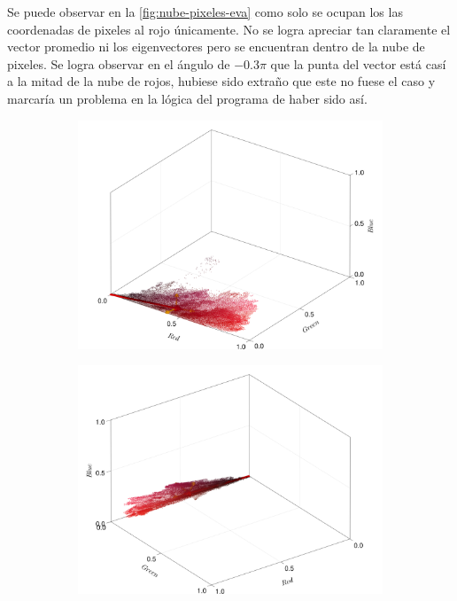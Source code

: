 Se puede observar en la \cref{fig:nube-pixeles-eva} como solo se ocupan los las coordenadas de pixeles al rojo únicamente. No se logra apreciar tan claramente el vector promedio ni los eigenvectores pero se encuentran dentro de la nube de pixeles. Se logra observar en el ángulo de $-0.3\pi$ que la punta del vector está casí a la mitad de la nube de rojos, hubiese sido extraño que este no fuese el caso y marcaría un problema en la lógica del programa de haber sido así.
\begin{figure}[ht!]
    \centering
    \begin{subfigure}[c]{0.3\textwidth}
        \centering
        \includegraphics[scale=0.09]{../pictures/pixel_cloud_eva_1}
    \end{subfigure}
    \begin{subfigure}[c]{0.3\textwidth}
        \centering
        \includegraphics[scale=0.09]{../pictures/pixel_cloud_eva_2}

\end{subfigure}
\end{figure}
